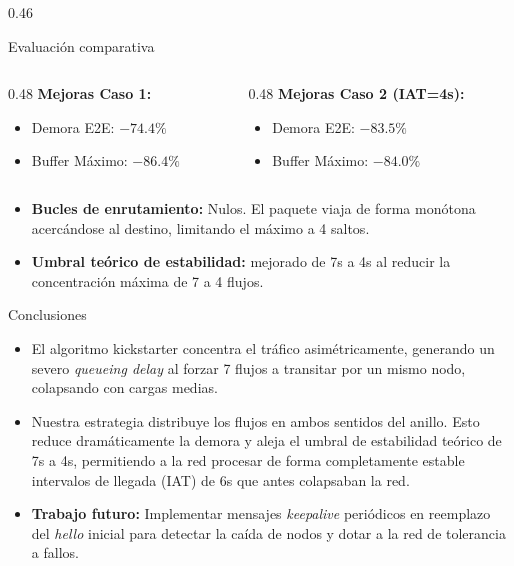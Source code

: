 \documentclass[final]{beamer}
\begin{document}
\begin{frame}[t]
\begin{columns}[T,totalwidth=0.98\paperwidth]
\begin{column}{0.46\paperwidth}
\begin{block}{Evaluación comparativa}
    \vspace{0.35cm}

    \vspace{0.75cm}
    \begin{columns}[T,totalwidth=\linewidth]
      \begin{column}{0.48\linewidth}
        \textbf{Mejoras Caso 1:}
        \begin{itemize}
          \item Demora E2E: \textbf{$-74.4\%$}
          \item Buffer Máximo: \textbf{$-86.4\%$}
        \end{itemize}
      \end{column}
      \begin{column}{0.48\linewidth}
        \textbf{Mejoras Caso 2 (IAT=4s):}
        \begin{itemize}
          \item Demora E2E: \textbf{$-83.5\%$}
          \item Buffer Máximo: \textbf{$-84.0\%$}
        \end{itemize}
      \end{column}
    \end{columns}
\vspace{0.35cm}
    \begin{itemize}
      \item \textbf{Bucles de enrutamiento:} Nulos. El paquete viaja de forma monótona acercándose al destino, limitando el máximo a 4 saltos.
      \item \textbf{Umbral teórico de estabilidad:} mejorado de 7s a 4s al reducir la concentración máxima de 7 a 4 flujos.
    \end{itemize}
  \end{block}

  \vspace{0.45cm}

  \begin{alertblock}{Conclusiones}
    \begin{itemize}
      \item El algoritmo kickstarter concentra el tráfico asimétricamente, generando un severo \textit{queueing delay} al forzar 7 flujos a transitar por un mismo nodo, colapsando con cargas medias.
      \item Nuestra estrategia distribuye los flujos en ambos sentidos del anillo. Esto reduce dramáticamente la demora y aleja el umbral de estabilidad teórico de 7s a 4s, permitiendo a la red procesar de forma completamente estable intervalos de llegada (IAT) de 6s que antes colapsaban la red.
      \item \textbf{Trabajo futuro:} Implementar mensajes \emph{keepalive} periódicos en reemplazo del \emph{hello} inicial para detectar la caída de nodos y dotar a la red de tolerancia a fallos.
    \end{itemize}
  \end{alertblock}



\end{column}
\end{columns}
\end{frame}
\end{document}
